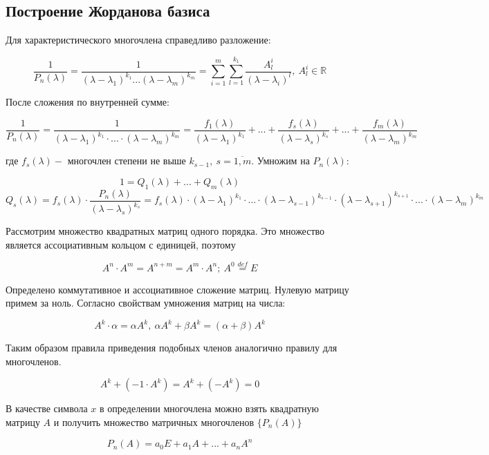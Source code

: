 \subsection{Построение Жорданова базиса}

Для характеристического многочлена справедливо разложение:

\[\frac{1}{P_n(\lambda)} = \frac{1}{(\lambda - \lambda_1)^{k_1}...(\lambda - \lambda_m)^{k_m}} = \sum\limits_{i = 1}^{m}{\sum\limits_{l=1}^{k_1}{\frac{A^i_l}{(\lambda - \lambda_i)^l}}},~ A^i_l \in \mathbb {R}\]

После сложения по внутренней сумме:

\[\frac{1}{P_n(\lambda)} = \frac{1}{(\lambda - \lambda_1)^{k_1} \cdot ...\cdot (\lambda - \lambda_m)^{k_m}} = \frac{f_1(\lambda)}{(\lambda-\lambda_1)^{k_1}} + ... + \frac{f_s(\lambda)}{(\lambda-\lambda_s)^{k_s}} + ... + \frac{f_m(\lambda)}{(\lambda-\lambda_m)^{k_m}}\]

где $f_s(\lambda) - $ многочлен степени не выше $k_{s-1},~ s = \overline{1,m}$. Умножим на $P_n(\lambda):$

\[1 = Q_1(\lambda) + ... + Q_m(\lambda)\]
\begin{equation}
Q_s(\lambda) = f_s(\lambda)\cdot\frac{P_n(\lambda)}{(\lambda - \lambda_s)^{k_s}} = f_s(\lambda)\cdot(\lambda - \lambda_1)^{k_1} \cdot ... \cdot (\lambda - \lambda_{s-1})^{k_{s-1}} \cdot (\lambda - \lambda_{s+1})^{k_{s+1}} \cdot ... \cdot (\lambda - \lambda_{m})^{k_{m}}
\label{20_1}
\end{equation}


Рассмотрим множество квадратных матриц одного порядка. Это множество является ассоциативным кольцом с единицей, поэтому

\[A^n \cdot A^m = A^{n+m} = A^m \cdot A^n;~ A^0 \stackrel{def}{=} E\]

Определено коммутативное и ассоциативное сложение матриц. Нулевую матрицу примем за ноль. Согласно свойствам умножения матриц на числа:

\[A^k \cdot \alpha = \alpha A^k,~ \alpha A^k + \beta A^k = (\alpha + \beta) A^k\]

Таким образом правила приведения подобных членов аналогично правилу для многочленов.

\[A^k + (-1 \cdot A^k) = A^k + (-A^k) = 0\]

В качестве символа $x$ в определении многочлена можно взять квадратную матрицу $A$ и получить множество матричных многочленов $\{P_n(A)\}$

\[P_n(A) = a_0 E + a_1 A + ... + a_n A^n\]

